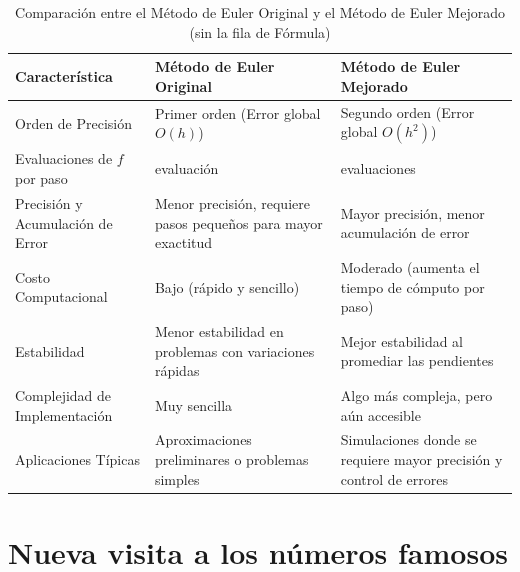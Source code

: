 \documentclass[12pt,a4paper]{article}
\begin{document}
    \begin{table}[ht]
        \centering
        \begin{tabular}{>{\raggedright\arraybackslash}p{3.5cm}  >{\raggedright\arraybackslash}p{6cm}  >{\raggedright\arraybackslash}p{6cm}}
        \toprule
        \textbf{Característica} & \textbf{Método de Euler Original} & \textbf{Método de Euler Mejorado} \\
        \midrule
        Orden de Precisión & Primer orden (Error global \( O(h) \)) & Segundo orden (Error global \( O(h^2) \)) \\
        \addlinespace
        Evaluaciones de \( f \) por paso & 1 evaluación & 2 evaluaciones \\
        \addlinespace
        Precisión y Acumulación de Error & Menor precisión, requiere pasos pequeños para mayor exactitud & Mayor precisión, menor acumulación de error \\
        \addlinespace
        Costo Computacional & Bajo (rápido y sencillo) & Moderado (aumenta el tiempo de cómputo por paso) \\
        \addlinespace
        Estabilidad & Menor estabilidad en problemas con variaciones rápidas & Mejor estabilidad al promediar las pendientes \\
        \addlinespace
        Complejidad de Implementación & Muy sencilla & Algo más compleja, pero aún accesible \\
        \addlinespace
        Aplicaciones Típicas & Aproximaciones preliminares o problemas simples & Simulaciones donde se requiere mayor precisión y control de errores \\
        \bottomrule
        \end{tabular}
        \caption{Comparación entre el Método de Euler Original y el Método de Euler Mejorado (sin la fila de Fórmula)}
        \label{tab:comparacion}
        \end{table}
        \section{Nueva visita a los números famosos}
\end{document}
